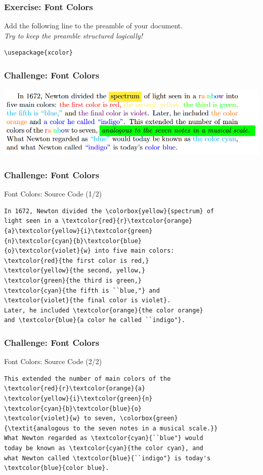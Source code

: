 \begin{frame}[fragile]
\frametitle{Exercise: Font Colors}
Add the following line to the preamble of your document. \\
\textit{\small Try to keep the preamble structured logically!}
\begin{alertblock}{}
\small
\begin{verbatim}
\usepackage{xcolor}   
\end{verbatim}
\end{alertblock}
\end{frame}


\begin{frame}[fragile]
\frametitle{Challenge: Font Colors}
\includegraphics[width=\linewidth]{img/colorsChallenge.png}
\end{frame}


\begin{frame}[fragile]
\frametitle{Challenge: Font Colors}
\begin{alertblock}{Font Colors: Source Code (1/2)}
\small
\begin{verbatim}
In 1672, Newton divided the \colorbox{yellow}{spectrum} of 
light seen in a \textcolor{red}{r}\textcolor{orange}
{a}\textcolor{yellow}{i}\textcolor{green}
{n}\textcolor{cyan}{b}\textcolor{blue}
{o}\textcolor{violet}{w} into five main colors: 
\textcolor{red}{the first color is red,} 
\textcolor{yellow}{the second, yellow,} 
\textcolor{green}{the third is green,} 
\textcolor{cyan}{the fifth is ``blue,"} and 
\textcolor{violet}{the final color is violet}.
Later, he included \textcolor{orange}{the color orange} 
and \textcolor{blue}{a color he called ``indigo"}. 
\end{verbatim} 
\end{alertblock}
\end{frame}

\begin{frame}[fragile]
\frametitle{Challenge: Font Colors}
\begin{alertblock}{Font Colors: Source Code (2/2)}
\small
\begin{verbatim}
This extended the number of main colors of the 
\textcolor{red}{r}\textcolor{orange}{a} 
\textcolor{yellow}{i}\textcolor{green}{n} 
\textcolor{cyan}{b}\textcolor{blue}{o} 
\textcolor{violet}{w} to seven, \colorbox{green}
{\textit{analogous to the seven notes in a musical scale.}}
What Newton regarded as \textcolor{cyan}{``blue"} would 
today be known as \textcolor{cyan}{the color cyan}, and 
what Newton called \textcolor{blue}{``indigo"} is today's  
\textcolor{blue}{color blue}.
\end{verbatim} 
\end{alertblock}
\end{frame}



